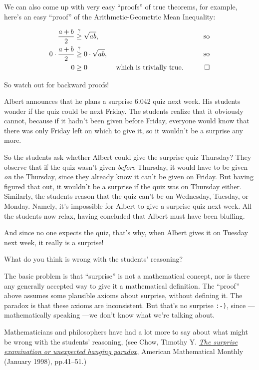 \documentclass[handout]{mcs}
\begin{document}
\begin{solution}
We can also come up with very easy ``proofs'' of true theorems, for
example, here's an easy ``proof'' of the Arithmetic-Geometric Mean
Inequality:

\begin{bogusproof}
\begin{align*}
\frac{a + b}{2} & \stackrel{?}{\geq} \sqrt{a b}, & \text{ so}\\
0 \cdot \frac{a + b}{2} & \stackrel{?}{\geq} 0 \cdot \sqrt{a b}, & \text{ so}\\
0 & \geq 0 & \text{ which is trivially true.}\quad \qedhere
\end{align*}
\end{bogusproof}

So watch out for backward proofs!
\end{solution}

\begin{problem} Albert announces that he plans a surprise 6.042
quiz next week.  His students wonder if the quiz could be next Friday.
The students realize that it obviously cannot, because if it hadn't been
given before Friday, everyone would know that there was only Friday left
on which to give it, so it wouldn't be a surprise any more.

So the students ask whether Albert could give the surprise quiz Thursday?
They observe that if the quiz wasn't given \emph{before} Thursday, it
would have to be given \emph{on} the Thursday, since they already know it
can't be given on Friday.  But having figured that out, it wouldn't be a
surprise if the quiz was on Thursday either.  Similarly, the students
reason that the quiz can't be on Wednesday, Tuesday, or Monday.  Namely,
it's impossible for Albert to give a surprise quiz next week.  All the
students now relax, having concluded that Albert must have been bluffing.

And since no one expects the quiz, that's why, when Albert gives it on
Tuesday next week, it really is a surprise!

What do you think is wrong with the students' reasoning?

\begin{solution}
The basic problem is that ``surprise'' is not a mathematical
concept, nor is there any generally accepted way to give it a mathematical
definition.  The ``proof'' above assumes some plausible axioms about
surprise, without defining it.  The paradox is that these axioms are
inconsistent.  But that's no surprise \texttt{:-)}, since ---mathematically
speaking ---we don't know what we're talking about.

Mathematicians and philosophers have had a lot more to say about what might
be wrong with the students' reasoning, (see Chow, Timothy Y.
\href{http://courses.csail.mit.edu/6.042/fall09/surprise-paradox.pdf}
{\emph{The surprise examination or unexpected hanging paradox}}, American
Mathematical Monthly (January 1998), pp.41--51.)
\end{solution}

\end{problem}

\end{document}
